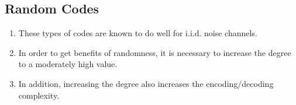 \subsection{Random Codes}
\label{sec:random_cdoes}

\begin{enumerate}	
	\item These types of codes are known to do well for i.i.d. noise channels.
	\item In order to get benefits of randomness, it is necessary to increase the degree to a moderately high value.
	\item In addition, increasing the degree also increases the encoding/decoding complexity.
\end{enumerate}